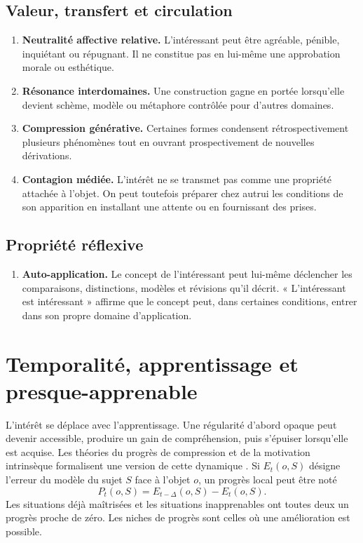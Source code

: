 \documentclass[11pt,a4paper]{article}
\begin{document}
\subsection{Valeur, transfert et circulation}

\begin{enumerate}[resume]
  \item \textbf{Neutralité affective relative.} L'intéressant peut être
        agréable, pénible, inquiétant ou répugnant. Il ne constitue pas en
        lui-même une approbation morale ou esthétique.
  \item \textbf{Résonance interdomaines.} Une construction gagne en portée
        lorsqu'elle devient schème, modèle ou métaphore contrôlée pour d'autres
        domaines.
  \item \textbf{Compression générative.} Certaines formes condensent
        rétrospectivement plusieurs phénomènes tout en ouvrant prospectivement
        de nouvelles dérivations.
  \item \textbf{Contagion médiée.} L'intérêt ne se transmet pas comme une
        propriété attachée à l'objet. On peut toutefois préparer chez autrui les
        conditions de son apparition en installant une attente ou en fournissant
        des prises.
\end{enumerate}

\subsection{Propriété réflexive}

\begin{enumerate}[resume]
  \item \textbf{Auto-application.} Le concept de l'intéressant peut lui-même
        déclencher les comparaisons, distinctions, modèles et révisions qu'il
        décrit. « L'intéressant est intéressant » affirme que le concept peut,
        dans certaines conditions, entrer dans son propre domaine
        d'application.
\end{enumerate}

\section{Temporalité, apprentissage et presque-apprenable}

L'intérêt se déplace avec l'apprentissage. Une régularité d'abord opaque peut
devenir accessible, produire un gain de compréhension, puis s'épuiser lorsqu'elle
est acquise. Les théories du progrès de compression et de la motivation
intrinsèque formalisent une version de cette dynamique
\parencite{schmidhuber1997interesting,schmidhuber2009compression,oudeyer2007intrinsic,oudeyer2007typology}.
Si \(E_t(o,S)\) désigne l'erreur du modèle du sujet \(S\) face à l'objet \(o\),
un progrès local peut être noté
\[
  P_t(o,S)=E_{t-\Delta}(o,S)-E_t(o,S).
\]
Les situations déjà maîtrisées et les situations inapprenables ont toutes deux
un progrès proche de zéro. Les niches de progrès sont celles où une amélioration
est possible.
\end{document}
